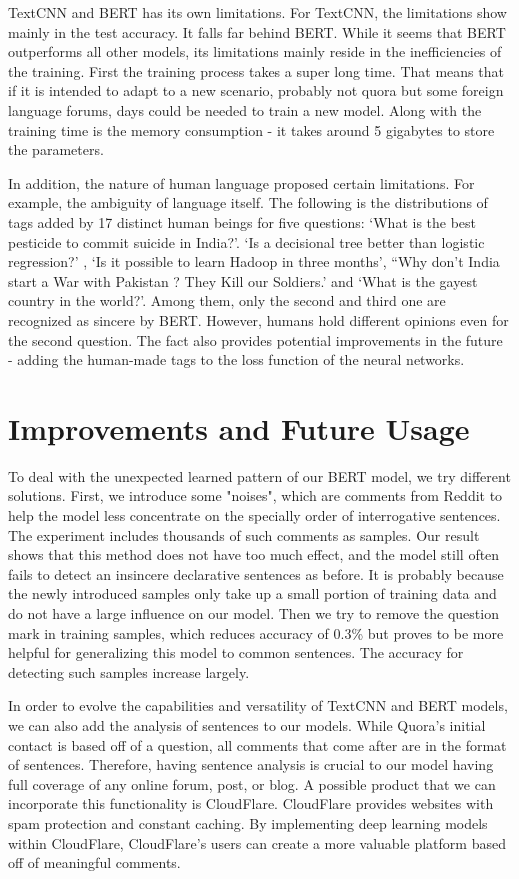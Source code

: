 \documentclass{article}
\begin{document}
TextCNN and BERT has its own limitations. For TextCNN, the limitations show mainly in the test accuracy. It falls far behind BERT. While it seems that BERT outperforms all other models, its limitations mainly reside in the inefficiencies of the training. First the training process takes a super long time. That means that if it is intended to adapt to a new scenario, probably not quora but some foreign language forums, days could be needed to train a new model.  Along with the training time is the memory consumption - it takes around 5 gigabytes to store the parameters.

In addition, the nature of human language proposed certain limitations. For example, the ambiguity of language itself. The following is the distributions of tags added by 17 distinct human beings for five questions: ‘What is the best pesticide to commit suicide in India?’. ‘Is a decisional tree better than logistic regression?’ , ‘Is it possible to learn Hadoop in three months’, “Why don't India start a War with Pakistan ? They Kill our Soldiers.’ and  ‘What is the gayest country in the world?’. Among them, only the second and third one are recognized as sincere by BERT. However, humans hold different opinions even for the second question. The fact also provides potential improvements in the future - adding the human-made tags to the loss function of the neural networks. 



\section{Improvements and Future Usage}
To deal with the unexpected learned pattern of our BERT model, we try different solutions. First, we introduce some "noises", which are comments from Reddit to help the model less concentrate on the specially order of interrogative sentences. The experiment includes thousands of such comments as samples. Our result shows that this method does not have too much effect, and the model still often fails to detect an insincere declarative sentences as before. It is probably because the newly introduced samples only take up a small portion of training data and do not have a large influence on our model. Then we try to remove the question mark in training samples, which reduces accuracy of 0.3\% but proves to be more helpful for generalizing this model to common sentences. The accuracy for detecting such samples increase largely.

In order to evolve the capabilities and versatility of TextCNN and BERT models,  we can also add the analysis of sentences to our models. While Quora's initial contact is based off of a question, all comments that come after are in the format of sentences. Therefore, having sentence analysis is crucial to our model having full coverage of any online forum, post, or blog. A possible product that we can incorporate this functionality is CloudFlare. CloudFlare provides websites with spam protection and constant caching. By implementing deep learning models within CloudFlare, CloudFlare's users can create a more valuable platform based off of meaningful comments. 
\end{document}
